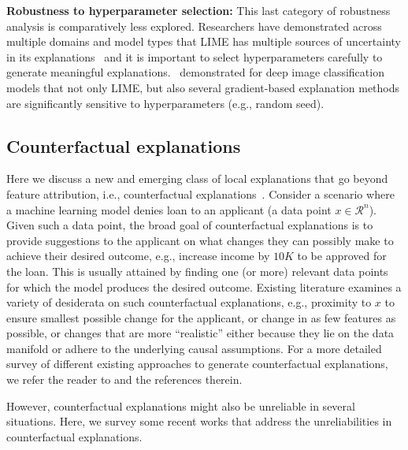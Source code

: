 \documentclass[sigconf]{acmart}
\newcommand{\sm}[1]{\textcolor{brown}{#1}}
\begin{document}
\textbf{Robustness to hyperparameter selection:} This last category of robustness analysis is comparatively less explored. %
Researchers have demonstrated across multiple domains and model types that LIME has multiple sources of uncertainty in its explanations~\cite{Mishra_ijcnn_2020, Zhang_arXiv_2019} and it is important to select hyperparameters carefully to generate meaningful explanations.~\citet{Bansal_cvpr_2020} demonstrated for deep image classification models that not only LIME, but also several gradient-based explanation methods are significantly sensitive to hyperparameters (e.g., random seed).

\vspace{-1mm}
\subsection{Counterfactual explanations}


Here we discuss a new and emerging class of local explanations that go beyond feature attribution, i.e., counterfactual explanations~\cite{verma2020counterfactual,wachter2017counterfactual}. Consider a scenario where a machine learning model denies loan to an applicant (a data point $x\in \mathcal{R}^n$). Given such a data point, the broad goal of counterfactual explanations is to provide suggestions to the applicant on what changes they can possibly make to achieve their desired outcome, e.g., increase income by $10K$ to be approved for the loan. This is usually attained by finding one (or more) relevant data points for which the model produces the desired outcome.  Existing literature examines a variety of desiderata on such counterfactual explanations, e.g., proximity to $x$ to ensure smallest possible change for the applicant, or change in as few features as possible, or changes that are more ``realistic'' either because they lie on the data manifold or adhere to the underlying causal assumptions. For a more detailed survey of different existing approaches to generate counterfactual explanations, we refer the reader to \cite{verma2020counterfactual, Karimi_arXiv_2020} and the references therein.

However, counterfactual explanations might also be unreliable in several situations. Here, we survey some recent works that address the unreliabilities in counterfactual explanations.
\end{document}

